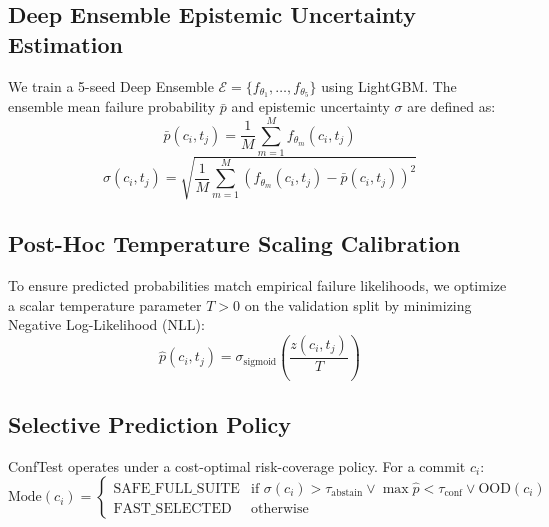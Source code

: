 \documentclass[sigconf,screen]{acmart}
\begin{document}
\subsection{Deep Ensemble Epistemic Uncertainty Estimation}
We train a 5-seed Deep Ensemble $\mathcal{E} = \{f_{\theta_1}, \dots, f_{\theta_5}\}$ using LightGBM. The ensemble mean failure probability $\bar{p}$ and epistemic uncertainty $\sigma$ are defined as:
\begin{equation}
    \bar{p}(c_i, t_j) = \frac{1}{M} \sum_{m=1}^M f_{\theta_m}(c_i, t_j)
\end{equation}
\begin{equation}
    \sigma(c_i, t_j) = \sqrt{\frac{1}{M} \sum_{m=1}^M \left( f_{\theta_m}(c_i, t_j) - \bar{p}(c_i, t_j) \right)^2}
\end{equation}

\subsection{Post-Hoc Temperature Scaling Calibration}
To ensure predicted probabilities match empirical failure likelihoods, we optimize a scalar temperature parameter $T > 0$ on the validation split by minimizing Negative Log-Likelihood (NLL):
\begin{equation}
    \hat{p}(c_i, t_j) = \sigma_{\text{sigmoid}}\left( \frac{z(c_i, t_j)}{T} \right)
\end{equation}

\subsection{Selective Prediction Policy}
ConfTest operates under a cost-optimal risk-coverage policy. For a commit $c_i$:
\begin{equation}
    \text{Mode}(c_i) = \begin{cases}
        \text{SAFE\_FULL\_SUITE} & \text{if } \sigma(c_i) > \tau_{\text{abstain}} \lor \max \hat{p} < \tau_{\text{conf}} \lor \text{OOD}(c_i) \\
        \text{FAST\_SELECTED} & \text{otherwise}
    \end{cases}
\end{equation}
\end{document}
